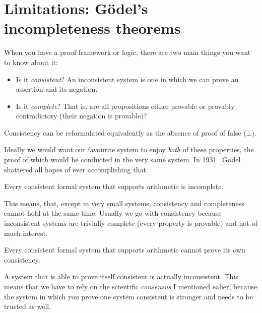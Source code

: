 \section{Limitations: Gödel's incompleteness theorems}

When you have a proof framework or logic, there are two main things you want to
know about it:
\begin{itemize}
  \item Is it \emph{consistent}? An inconsistent system is one in which we can
  prove an assertion and its negation.
  \item Is it \emph{complete}? That is, are all propositions either provable
  or provably contradictory (\ie their negation is provable)?
\end{itemize}

Consistency can be reformulated equivalently as the absence of proof of false
(\(\bot\)).

Ideally we would want our favourite system to enjoy \emph{both} of these
properties, the proof of which would be conducted in the very same system.
In 1931~ Gödel shattered all hopes of ever
accomplishing that.

\begin{theorem}
  Every consistent formal system that supports arithmetic is incomplete.
\end{theorem}

This means, that, except in very small systems, consistency and completeness
cannot hold at the same time. Usually we go with consistency because
inconsistent systems are trivially complete (every property is provable) and not
of much interest.

\begin{theorem}
  Every consistent formal system that supports arithmetic cannot prove its
  own consistency.
\end{theorem}
A system that is able to prove itself consistent is actually inconsistent.
This means that we have to rely on the scientific \emph{consensus} I mentioned
ealier, because the system in which you prove one system consistent is stronger
and needs to be trusted as well.

